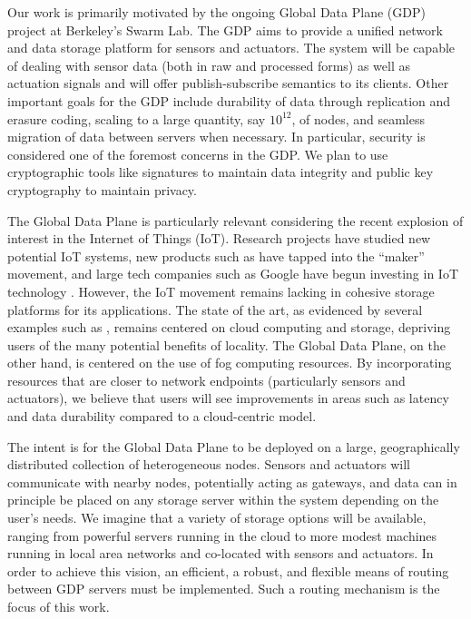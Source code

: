 Our work is primarily motivated by the ongoing Global Data Plane (GDP)\cite{gdp} project at Berkeley's Swarm Lab. The GDP aims to provide a unified network and data storage platform for sensors and actuators. The system will be capable of dealing with sensor data (both in raw and processed forms) as well as actuation signals and will offer publish-subscribe semantics to its clients. Other important goals for the GDP include durability of data through replication and erasure coding, scaling to a large quantity, say $10^{12}$, of nodes, and seamless migration of data between servers when necessary. In particular, security is considered one of the foremost concerns in the GDP. We plan to use cryptographic tools like signatures to maintain data integrity and public key cryptography to maintain privacy.

The Global Data Plane is particularly relevant considering the recent explosion of interest in the Internet of Things (IoT). Research projects \cite{homeOS, terraswarm, bas, boss} have studied new potential IoT systems, new products such as \cite{arduino} have tapped into the ``maker'' movement, and large tech companies such as Google have begun investing in IoT technology \cite{nest}. However, the IoT movement remains lacking in cohesive storage platforms for its applications. The state of the art, as evidenced by several examples such as \cite{ibm}, remains centered on cloud computing and storage, depriving users of the many potential benefits of locality. The Global Data Plane, on the other hand, is centered on the use of fog computing \cite{fog} resources. By incorporating resources that are closer to network endpoints (particularly sensors and actuators), we believe that users will see improvements in areas such as latency and data durability compared to a cloud-centric model.

The intent is for the Global Data Plane to be deployed on a large, geographically distributed collection of heterogeneous nodes. Sensors and actuators will communicate with nearby nodes, potentially acting as gateways, and data can in principle be placed on any storage server within the system depending on the user's needs. We imagine that a variety of storage options will be available, ranging from powerful servers running in the cloud to more modest machines running in local area networks and co-located with sensors and actuators. In order to achieve this vision, an efficient, a robust, and flexible means of routing between GDP servers must be implemented. Such a routing mechanism is the focus of this work.

